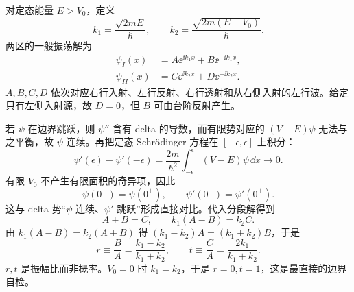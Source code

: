 

对定态能量 $E>V_0$，定义
\begin{equation}
  k_1=\frac{\sqrt{2mE}}{\hbar},
  \qquad
  k_2=\frac{\sqrt{2m(E-V_0)}}{\hbar}.
  \label{eq:QM-C05-S04-wave-numbers}
\end{equation}
两区的一般振荡解为
\begin{align}
  \psi_I(x)&=A\ee^{\ii k_1x}+B\ee^{-\ii k_1x},\\
  \psi_{II}(x)&=C\ee^{\ii k_2x}+D\ee^{-\ii k_2x}.
  \label{eq:QM-C05-S04-general-propagating-solutions}
\end{align}
$A,B,C,D$ 依次对应右行入射、左行反射、右行透射和从右侧入射的左行波。给定只有左侧入射源，故 $D=0$，但 $B$ 可由台阶反射产生。

若 $\psi$ 在边界跳跃，则 $\psi''$ 含有 delta 的导数，而有限势对应的 $(V-E)\psi$ 无法与之平衡，故 $\psi$ 连续。再把定态 Schr\"odinger 方程在 $[-\epsilon,\epsilon]$ 上积分：
\begin{equation}
  \psi'(\epsilon)-\psi'(-\epsilon)
  =\frac{2m}{\hbar^2}
    \int_{-\epsilon}^{\epsilon}(V-E)\psi\,\dd x
  \longrightarrow0.
\end{equation}
有限 $V_0$ 不产生有限面积的奇异项，因此
\begin{equation}
  \psi(0^-)=\psi(0^+),
  \qquad
  \psi'(0^-)=\psi'(0^+).
  \label{eq:QM-C05-S04-finite-step-boundary}
\end{equation}
这与 delta 势“$\psi$ 连续、$\psi'$ 跳跃”形成直接对比。代入分段解得到
\begin{equation}
  A+B=C,
  \qquad
  k_1(A-B)=k_2C.
  \label{eq:QM-C05-S04-matching-equations}
\end{equation}
由 $k_1(A-B)=k_2(A+B)$ 得 $(k_1-k_2)A=(k_1+k_2)B$，于是
\begin{equation}
  \boxed{
  r\equiv\frac BA=\frac{k_1-k_2}{k_1+k_2}},
  \qquad
  \boxed{
  t\equiv\frac CA=\frac{2k_1}{k_1+k_2}}.
  \label{eq:QM-C05-S04-amplitudes-above-step}
\end{equation}
$r,t$ 是振幅比而非概率。$V_0=0$ 时 $k_1=k_2$，于是 $r=0,t=1$，这是最直接的边界自检。



